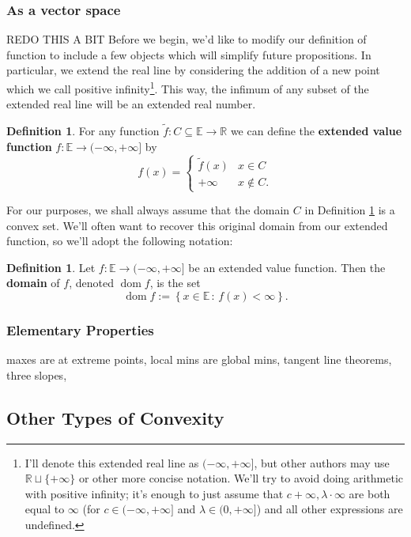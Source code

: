 \documentclass[11pt]{article}
\numberwithin{equation}{section}
\theoremstyle{definition}
\newtheorem{definition}[theorem]{Definition}%
\newcommand{\bE}{\mathbb{E}}
\newcommand{\bR}{\mathbb{R}}
\newcommand{\set}[2]{\left\{#1\,:\,#2\right\}}
\newcommand{\dom}{\operatorname{dom}}
\begin{document}
\subsubsection{As a vector space}
REDO THIS A BIT
Before we begin, we'd like to modify our definition of function to include a few objects which will simplify future propositions. In particular, we extend the real line by considering the addition of a new point which we call positive infinity\footnote{I'll denote this extended real line as $(-\infty,+\infty]$, but other authors may use $\bR\sqcup\{+\infty\}$ or other more concise notation. We'll try to avoid doing arithmetic with positive infinity; it's enough to just assume that $c+\infty, \lambda\cdot \infty$ are both equal to $\infty$ (for $c\in(-\infty,+\infty]$ and $\lambda\in(0,+\infty]$) and all other expressions are undefined.}. This way, the infimum of any subset of the extended real line will be an extended real number.
\begin{definition}
\label{defevf}%
    For any function $\tilde f:C\subseteq\bE\to\bR$ we can define the \textbf{extended value function} $f:\bE\to(-\infty,+\infty]$ by
    \begin{equation}
        f(x)=\begin{cases}
            \tilde f(x)& x\in C\\
            +\infty & x\not\in C.
        \end{cases}
    \end{equation}
\end{definition}
For our purposes, we shall always assume that the domain $C$ in Definition \ref{defevf} is a convex set. We'll often want to recover this original domain from our extended function, so we'll adopt the following notation:
\begin{definition}
    Let $f:\bE\to(-\infty,+\infty]$ be an extended value function. Then the \textbf{domain} of $f$, denoted $\dom f$, is the set
    \begin{equation}
        \dom f:=\set{x\in\bE}{f(x)<\infty}.
    \end{equation}
\end{definition}
\subsubsection{Elementary Properties}
 maxes are at extreme points, local mins are global mins, tangent line theorems, three slopes,
\subsection{Other Types of Convexity}
\end{document}

